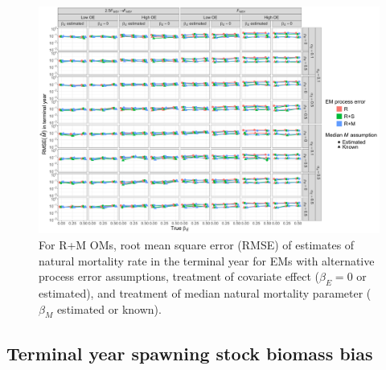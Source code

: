 \documentclass[
  12pt,
]{article}
\begin{document}
\begin{landscape}
\begin{figure}
\begin{center}
\includegraphics[height = \textheight]{terminal_year_M_rmse_RMom}
\end{center}
\caption{For R+M OMs, root mean square error (RMSE) of estimates of natural mortality rate in the terminal year for EMs with alternative process error assumptions, treatment of covariate effect ($\beta_E = 0$ or estimated), and treatment of median natural mortality parameter ($\beta_M$ estimated or known).}\label{terminal_M_rmse_RMom}
\end{figure}
\end{landscape}

\hypertarget{terminal-year-spawning-stock-biomass-bias}{%
\subsection*{Terminal year spawning stock biomass bias}\label{terminal-year-spawning-stock-biomass-bias}}
\end{document}

